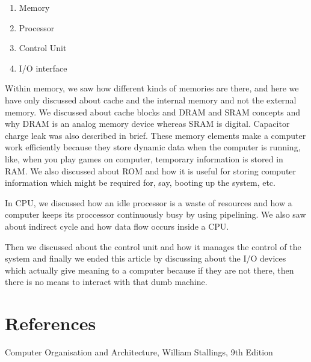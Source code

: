 \documentclass{article}
\begin{document}
\begin{enumerate}
	\item Memory
	\item Processor
	\item Control Unit
	\item I/O interface
\end{enumerate}

Within memory, we saw how different kinds of memories are there, and here we have only discussed about cache and the internal memory and not the external memory. We discussed about cache blocks and DRAM and SRAM concepts and why DRAM is an analog memory device whereas SRAM is digital. Capacitor charge leak was also described in brief. These memory elements make a computer work efficiently because they store dynamic data when the computer is running, like, when you play games on computer, temporary information is stored in RAM. We also discussed about ROM and how it is useful for storing computer information which might be required for, say, booting up the system, etc.
\par In CPU, we discussed how an idle processor is a waste of resources and how a computer keeps its proccessor continuously busy by using pipelining. We also saw about indirect cycle and how data flow occurs inside a CPU. 
\par Then we discussed about the control unit and how it manages the control of the system and finally we ended this article by discussing about the I/O devices which actually give meaning to a computer because if they are not there, then there is no means to interact with that dumb machine.

\section{References}
Computer Organisation and Architecture, William Stallings, 9th Edition
\\

\centering
\decothreeleft\decothreeright\decothreeleft\decothreeright\decothreeleft\decothreeright
\end{document}
